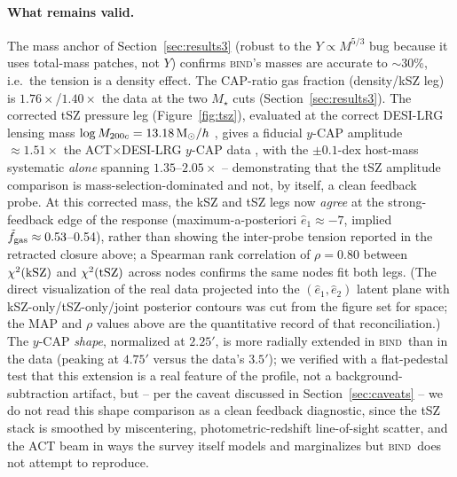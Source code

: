 \documentclass[11pt]{article}
\newcommand{\bind}{\textsc{bind}}
\newcommand{\fgt}{\tilde{f}_{\rm gas}}          %
\newcommand{\Msun}{{\rm M}_\odot}
\newcommand{\Mhalo}{M_{200c}}
\begin{document}
\paragraph{What remains valid.} The mass anchor of Section~\ref{sec:results3}
(robust to the $Y\propto M^{5/3}$ bug because it uses total-mass patches, not
$Y$) confirms \bind's masses are accurate to $\sim$30\%, i.e.\ the tension is a
density effect. %
The CAP-ratio gas fraction (density/kSZ leg) is $1.76\times$/$1.40\times$
the data at the two $M_\star$ cuts (Section~\ref{sec:results3}). %
The corrected
tSZ pressure leg (Figure~\ref{fig:tsz}), evaluated at the correct DESI-LRG lensing mass
$\log\Mhalo=13.18\,\Msun/h$ \citep{sailer24}, gives a fiducial $y$-CAP
amplitude $\approx1.51\times$ the ACT$\times$DESI-LRG $y$-CAP data
\citep{ycapdata25}, with the $\pm0.1$-dex host-mass
systematic \emph{alone} spanning $1.35$--$2.05\times$ -- demonstrating that the
tSZ amplitude comparison is mass-selection-dominated and not, by itself, a
clean feedback probe. %
At this corrected mass, the kSZ and tSZ legs now \emph{agree} at the
strong-feedback edge of the response (maximum-a-posteriori
$\hat{e}_1\approx-7$, implied $\fgt\approx0.53$--0.54), rather than showing the
inter-probe tension reported in the retracted closure above; a Spearman rank
correlation of $\rho=0.80$ between $\chi^2({\rm kSZ})$ and $\chi^2({\rm tSZ})$
across nodes confirms the same nodes fit both legs. %
(The direct visualization of the real data projected into the
$(\hat{e}_1,\hat{e}_2)$ latent plane with kSZ-only/tSZ-only/joint posterior
contours was cut from the figure set for space; the MAP and $\rho$ values
above are the quantitative record of that reconciliation.)
The $y$-CAP \emph{shape}, normalized at $2.25'$, is more radially extended in
\bind\ than in the data (peaking at $4.75'$ versus the data's $3.5'$); we
verified with a flat-pedestal test that this extension is a real feature of
the profile, not a background-subtraction artifact, but -- per the caveat
discussed in Section~\ref{sec:caveats} -- we do not read this shape comparison
as a clean feedback diagnostic, since the tSZ stack is smoothed by
miscentering, photometric-redshift line-of-sight scatter, and the ACT beam in
ways the survey itself models and marginalizes but \bind\ does not attempt to
reproduce. %
\end{document}
